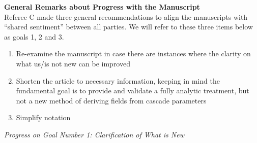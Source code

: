 \documentclass[12pt]{article}
\begin{document}
\textbf{General Remarks about Progress with the Manuscript} \\

Referee C made three general recommendations to align the manuscripts with ``shared sentiment'' between all parties.  We will refer to these three items below as goals 1, 2 and 3.

\begin{enumerate}
\item Re-examine the manuscript in case there are instances where the clarity on what
us/is not new can be improved
\item Shorten the article to necessary information, keeping in mind the fundamental goal
is to provide and validate a fully analytic treatment, but not a new method of
deriving fields from cascade parameters
\item Simplify notation
\end{enumerate}

\textit{Progress on Goal Number 1: Clarification of What is New}
\end{document}
